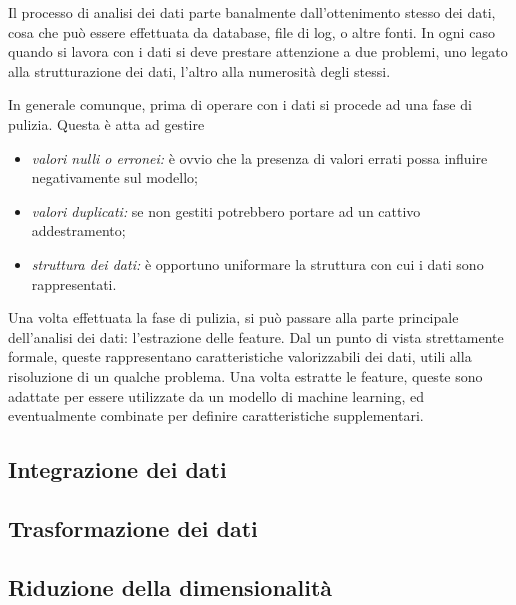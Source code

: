 \documentclass{subfiles}
\begin{document}
Il processo di analisi dei dati parte banalmente dall'ottenimento stesso dei dati,
cosa che può essere effettuata da database, file di log, o altre fonti.
In ogni caso quando si lavora con i dati si deve prestare attenzione a due problemi,
uno legato alla strutturazione dei dati, l'altro alla numerosità degli stessi.

In generale comunque, prima di operare con i dati si procede ad una fase di pulizia.
Questa è atta ad gestire
\begin{itemize}
    \item \emph{valori nulli o erronei:} è ovvio che la presenza di valori errati possa influire negativamente sul modello;
    \item \emph{valori duplicati:} se non gestiti potrebbero portare ad un cattivo addestramento;
    \item \emph{struttura dei dati:} è opportuno uniformare la struttura con cui i dati sono rappresentati.
\end{itemize}

Una volta effettuata la fase di pulizia, si può passare alla parte principale dell'analisi dei dati: l'estrazione delle feature.
Dal un punto di vista strettamente formale, queste rappresentano caratteristiche valorizzabili dei dati,
utili alla risoluzione di un qualche problema. Una volta estratte le feature, queste sono adattate per essere utilizzate da un modello di machine learning,
ed eventualmente combinate per definire caratteristiche supplementari.

\subsection{Integrazione dei dati}


\subsection{Trasformazione dei dati}


\subsection{Riduzione della dimensionalità}

\clearpage
\end{document}
